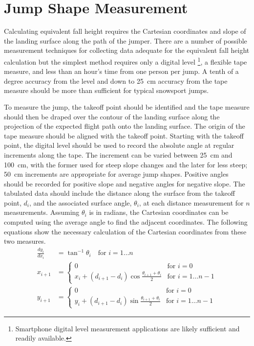 \documentclass[smallextended]{svjour3}       %
\begin{document}
\section{Jump Shape Measurement}
\label{sec:jump-shape-measurement}
%
Calculating equivalent fall height requires the Cartesian coordinates and slope
of the landing surface along the path of the jumper. There are a number of
possible measurement techniques for collecting data adequate for the equivalent
fall height calculation but the simplest method requires only a digital level
\footnote{Smartphone digital level measurement applications are likely
sufficient and readily available.}, a flexible tape measure, and less than an
hour's time from one person per jump. A tenth of a degree accuracy from the
level and down to 25~\si{\centi\meter} accuracy from the tape measure should be
more than sufficient for typical snowsport jumps.

To measure the jump, the takeoff point should be identified and the tape
measure should then be draped over the contour of the landing surface along the
projection of the expected flight path onto the landing surface. The origin of
the tape measure should be aligned with the takeoff point. Starting with the
takeoff point, the digital level should be used to record the absolute angle at
regular increments along the tape. The increment can be varied between
25~\si{\centi\meter} and 100~\si{\centi\meter}, with the former used for steep
slope changes and the later for less steep; 50~\si{\centi\meter} increments are
appropriate for average jump shapes. Positive angles should be recorded for
positive slope and negative angles for negative slope. The tabulated data
should include the distance along the surface from the takeoff point, $d_i$,
and the associated surface angle, $\theta_i$, at each distance measurement for
$n$ measurements. Assuming $\theta_i$ is in radians, the Cartesian coordinates
can be computed using the average angle to find the adjacent coordinates. The
following equations show the necessary calculation of the Cartesian
coordinates from these two measures.
%
\begin{align}
  \frac{dy_i}{dx_i} & = \tan^{-1}{\theta_i} \quad \text{for } i=1\ldots n \\
  x_{i + 1} & =
  \begin{cases}
    0 & \text{for } i=0 \\
    x_i + (d_{i+1} - d_i)\cos{\frac{\theta_{i+1} + \theta_i}{2}} &  \text{for }
    i=1\ldots n-1
  \end{cases} \\
  y_{i + 1} & =
  \begin{cases}
    0 & \text{for } i=0 \\
    y_i + (d_{i+1} - d_i)\sin{\frac{\theta_{i+1} + \theta_i}{2}} &  \text{for }
    i=1\ldots n-1
  \end{cases}
\end{align}
\end{document}
